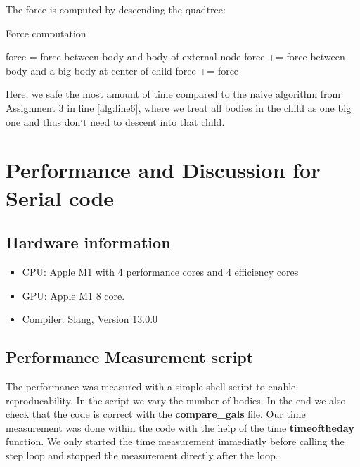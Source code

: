 \documentclass[a4paper]{scrartcl}
\begin{document}
        The force is computed by descending the quadtree:
        \begin{algorithm}[H]
            \caption{Force computation}\label{alg:compute_force}
            \begin{algorithmic}[1]
                \State force = force between body and body of external node
            \Else      
                    \label{alg:line6}
                        \State force += force between body and a big body at center of child
                        \State force += 
                    \EndIf
            \EndFor
            \EndIf
            \State \Return force
            \EndProcedure
            \end{algorithmic}
        \end{algorithm}
        Here, we safe the most amount of time compared to the naive algorithm
        from Assignment 3 in line \ref{alg:line6}, where we treat all bodies in the child as
        one big one and thus don`t need to descent into that child.


\section{Performance and Discussion for Serial code}
    \subsection{Hardware information}
        \begin{itemize}
            \item CPU: Apple M1 with 4 performance cores and 4 efficiency cores
            \item GPU: Apple M1 8 core.
            \item Compiler: Slang, Version 13.0.0
        \end{itemize}

    \subsection{Performance Measurement script}
        The performance was measured with a simple shell script to enable
        reproducability. In the script we vary the number of bodies. In the end
        we also check that the code is correct with the \textbf{compare\_gals} file. Our
        time measurement was done within the code with the help of the time
        \textbf{timeoftheday} function. We only started the time measurement
        immediatly before calling the step loop and stopped the measurement
        directly after the loop.
\end{document}
